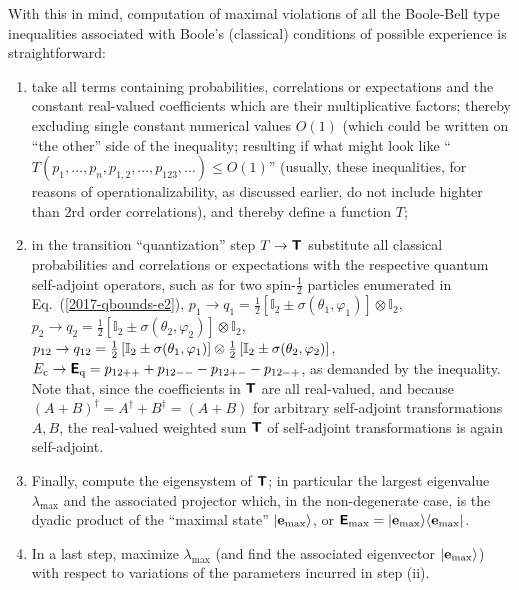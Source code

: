 With this in mind, computation of maximal violations of all the Boole-Bell type inequalities associated with
 Boole's  (classical) conditions of possible experience
is straightforward:
\begin{enumerate}

\item   take all terms containing probabilities, correlations or expectations
and the constant real-valued coefficients which are their
multiplicative factors;
thereby excluding single constant numerical values $O(1)$
(which could be written on ``the other'' side of the inequality; resulting if what might look like
``$T(p_1,\ldots,p_n, p_{1,2},\ldots,p_{123}, \ldots) \le O(1)$'' (usually, these inequalities,
for reasons of operationalizability, as discussed earlier, do not include highter than 2rd order correlations),
and thereby define a function $T$;
\item
in the transition ``quantization'' step $T \rightarrow \textsf{\textbf{T}}$
substitute all classical probabilities and correlations or expectations with the respective quantum
self-adjoint operators, such as for two spin-$\frac{1}{2}$ particles enumerated in Eq.~(\ref{2017-qbounds-e2}),
$p_1  \rightarrow  q_1
=
{\frac{1}{2}}\left[\mathbb{I}_2 \pm {\sigma}( \theta_1,\varphi_1)\right]\otimes  \mathbb{I}_2$,
$p_2  \rightarrow  q_2
=
{\frac{1}{2}}\left[\mathbb{I}_2 \pm {\sigma}( \theta_2,\varphi_2)\right]\otimes  \mathbb{I}_2$,
$p_{12} \rightarrow  q_{12}   =
{\frac{1}{2}}\left[\mathbb{I}_2 \pm {\bf \sigma}( \theta_1,\varphi_1)\right]
\otimes
{\frac{1}{2}}\left[\mathbb{I}_2 \pm {\bf \sigma}(  \theta_2,\varphi_2)\right]
$,
$
E_{\text{c}} \rightarrow
\textsf{\textbf{E}}_{\text{q}} =  p_{12++}+ p_{12--}  -p_{12+-} -p_{12-+}
$,
as demanded by the inequality.
Note that, since the coefficients in $\textsf{\textbf{T}}$ are all real-valued, and
because $(A+B)^\dagger =A^\dagger +B^\dagger = (A+B)$ for arbitrary self-adjoint transformations $A,B$,
the real-valued weighted sum $\textsf{\textbf{T}}$ of self-adjoint transformations is again self-adjoint.

\item
Finally, compute the eigensystem of $\textsf{\textbf{T}}$; in particular the
largest eigenvalue  $\lambda_{\text{max}}$ and the associated projector
which, in the non-degenerate case, is the dyadic product of the ``maximal state''
$\vert {\bf e}_{\text{max}} \rangle$, or
$\textsf{\textbf{E}}_{\text{max}} = \vert {\bf e}_{\text{max}} \rangle \langle  {\bf e}_{\text{max}} \vert $.

\item
In a last step, maximize $\lambda_{\text{max}}$
(and find the associated eigenvector $\vert {\bf e}_{\text{max}} \rangle$)
with respect to variations of the parameters incurred in step (ii).
\end{enumerate}

